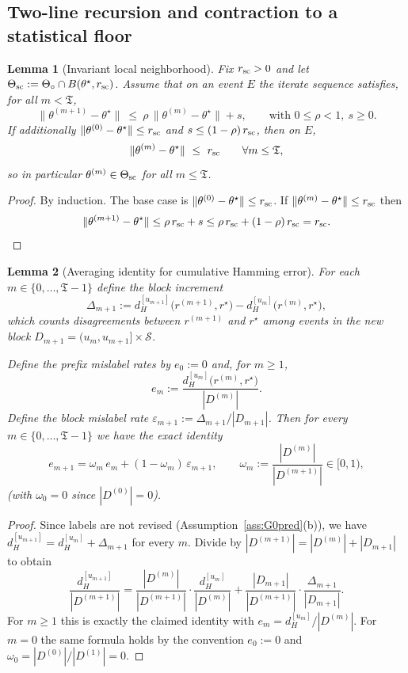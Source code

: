 \documentclass{statsoc}
\newtheorem{lemma}[lemma]{Lemma}
\newcommand{\1}{\mathbbm{1}}
\newcommand{\Tmax}{\mathfrak{T}}
\begin{document}
\subsection{Two-line recursion and contraction to a statistical floor}\label{sec:contraction}

\begin{lemma}[Invariant local neighborhood]\label{lem:inv-sc}
Fix $r_{\rm sc}>0$ and let $\Theta_{\rm sc}:=\Theta_\circ\cap B(\theta^\star,r_{\rm sc})$.
Assume that on an event $E$ the iterate sequence satisfies, for all $m<\Tmax$,
\[
\|\theta^{(m+1)}-\theta^\star\|\ \le\ \rho\,\|\theta^{(m)}-\theta^\star\| + s,
\qquad\text{with }0\le\rho<1,\ s\ge 0.
\]
If additionally $\|\theta^{(0)}-\theta^\star\|\le r_{\rm sc}$ and $s\le (1-\rho)\,r_{\rm sc}$, then on $E$,
\[
\|\theta^{(m)}-\theta^\star\|\ \le\ r_{\rm sc}\qquad\forall m\le \Tmax,
\]
so in particular $\theta^{(m)}\in\Theta_{\rm sc}$ for all $m\le\Tmax$.
\end{lemma}

\begin{proof}
By induction. The base case is $\|\theta^{(0)}-\theta^\star\|\le r_{\rm sc}$.
If $\|\theta^{(m)}-\theta^\star\|\le r_{\rm sc}$ then
\[
\|\theta^{(m+1)}-\theta^\star\|
\le \rho\,r_{\rm sc}+s
\le \rho\,r_{\rm sc}+(1-\rho)\,r_{\rm sc}
= r_{\rm sc}.
\]
\end{proof}


\begin{lemma}[Averaging identity for cumulative Hamming error]\label{lem:avg-hamming}
For each $m\in\{0,\dots,\Tmax-1\}$ define the block increment
\[
\Delta_{m+1}
:=d_H^{[u_{m+1}]}\!\big(r^{(m+1)},r^\star\big)-d_H^{[u_m]}\!\big(r^{(m)},r^\star\big),
\]
which counts disagreements between $r^{(m+1)}$ and $r^\star$ among events in the new block
$D_{m+1}=(u_m,u_{m+1}]\times\mathcal S$.

Define the prefix mislabel rates by $e_0:=0$ and, for $m\ge 1$,
\[
e_m:=\frac{d_H^{[u_m]}\!\big(r^{(m)},r^\star\big)}{|D^{(m)}|}.
\]
Define the block mislabel rate $\varepsilon_{m+1}:=\Delta_{m+1}/|D_{m+1}|$.
Then for every $m\in\{0,\dots,\Tmax-1\}$ we have the exact identity
\[
e_{m+1}
=
\omega_m\,e_m
+
(1-\omega_m)\,\varepsilon_{m+1},
\qquad
\omega_m:=\frac{|D^{(m)}|}{|D^{(m+1)}|}\in[0,1),
\]
(with $\omega_0=0$ since $|D^{(0)}|=0$).
\end{lemma}

\begin{proof}
Since labels are not revised (Assumption~\ref{ass:G0pred}(b)), we have
$d_H^{[u_{m+1}]}=d_H^{[u_m]}+\Delta_{m+1}$ for every $m$.
Divide by $|D^{(m+1)}|=|D^{(m)}|+|D_{m+1}|$ to obtain
\[
\frac{d_H^{[u_{m+1}]}}{|D^{(m+1)}|}
=
\frac{|D^{(m)}|}{|D^{(m+1)}|}\cdot \frac{d_H^{[u_m]}}{|D^{(m)}|}
+
\frac{|D_{m+1}|}{|D^{(m+1)}|}\cdot \frac{\Delta_{m+1}}{|D_{m+1}|}.
\]
For $m\ge 1$ this is exactly the claimed identity with $e_m=d_H^{[u_m]}/|D^{(m)}|$.
For $m=0$ the same formula holds by the convention $e_0:=0$ and $\omega_0=|D^{(0)}|/|D^{(1)}|=0$.
\end{proof}
\end{document}
